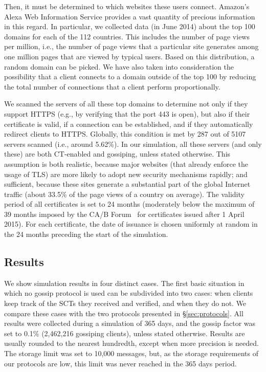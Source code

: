 Then, it must be determined to which websites these users connect. Amazon's Alexa
Web Information Service provides a vast quantity of precious information in this
regard. In particular, we collected data (in June 2014) about the top 100 domains for each of
the 112 countries. This includes the number of page views per million, i.e., the
number of page views that a particular site generates among one million pages
that are viewed by typical users. Based on this distribution, a random domain can be
picked. We have also taken into consideration the
possibility that a client connects to a domain outside of the
top 100 by reducing the total number of connections that a client perform
proportionally.

We scanned the servers of all these top domains to determine not only if they support
HTTPS (e.g., by verifying that the port 443 is open), but also if their certificate is valid,
if a connection can be established, and if they automatically redirect clients
to HTTPS. Globally, this condition is met by 287 out of 5107 servers scanned
(i.e., around 5.62\%). In our simulation, all these servers (and only these) are
both CT-enabled and gossiping, unless stated otherwise. This assumption is both realistic, because
major websites (that already enforce the usage of TLS) are more likely to adopt new security
mechanisms rapidly; and sufficient, because these sites generate a substantial
part of the global Internet traffic (about 33.5\% of the page views of a country
on average).
The validity period of all certificates is set to 24 months (moderately below
the maximum of 39 months imposed by the CA/B Forum~\cite{CABForum} for certificates
issued after 1 April 2015). For each certificate, the date of issuance is chosen
uniformly at random in the 24 months preceding the start of the simulation.

\subsection{Results}\label{sec:simulation_results}

We show simulation results in four distinct cases. The first basic situation
in which no gossip protocol is used can be subdivided into two cases: when clients keep
track of the SCTs they received and verified, and when they do not. We 
compare these cases with the two protocols presented in \S\ref{sec:protocols}. All
results were collected during a simulation of 365 days, and the
gossip factor was set to 0.1\% (2,462,216 gossiping clients), unless stated otherwise.
Results are usually rounded to the nearest hundredth, except when more precision is needed.
The storage limit  was set to 10,000 messages, but, as the storage requirements of
our protocols are low, this limit was never reached in the 365 days period.


